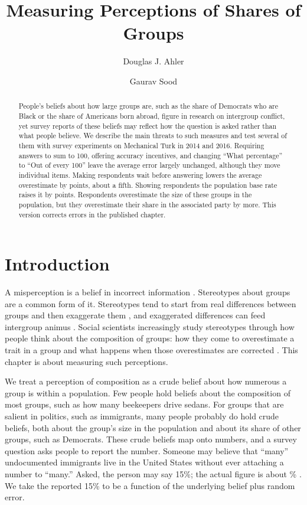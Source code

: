 \documentclass[11pt]{article}
\title{Measuring Perceptions of Shares of Groups}
\author{Douglas J. Ahler \and Gaurav Sood}
\date{}
\begin{document}
\maketitle

\begin{abstract}
\noindent People's beliefs about how large groups are, such as the share of Democrats who are Black or the share of Americans born abroad, figure in research on intergroup conflict, yet survey reports of these beliefs may reflect how the question is asked rather than what people believe. We describe the main threats to such measures and test several of them with survey experiments on Mechanical Turk in 2014 and 2016. Requiring answers to sum to 100, offering accuracy incentives, and changing ``What percentage'' to ``Out of every 100'' leave the average error largely unchanged, although they move individual items. Making respondents wait before answering lowers the average overestimate by \timeEffect{} points, about a fifth. Showing respondents the population base rate raises it by \brEffect{} points. Respondents overestimate the size of these groups in the population, but they overestimate their share in the associated party by more. This version corrects errors in the published chapter.
\end{abstract}

\section{Introduction}

A misperception is a belief in incorrect information \citep{luskin2013}. Stereotypes about groups are a common form of it. Stereotypes tend to start from real differences between groups and then exaggerate them \citep{bordalo2016}, and exaggerated differences can feed intergroup animus \citep{ahler2018}. Social scientists increasingly study stereotypes through how people think about the composition of groups: how they come to overestimate a trait in a group \citep{bordalo2016, gennaioli2010} and what happens when those overestimates are corrected \citep{ahler2018}. This chapter is about measuring such perceptions.

We treat a perception of composition as a crude belief about how numerous a group is within a population. Few people hold beliefs about the composition of most groups, such as how many beekeepers drive sedans. For groups that are salient in politics, such as immigrants, many people probably do hold crude beliefs, both about the group's size in the population and about its share of other groups, such as Democrats. These crude beliefs map onto numbers, and a survey question asks people to report the number. Someone may believe that ``many'' undocumented immigrants live in the United States without ever attaching a number to ``many.'' Asked, the person may say 15\%; the actual figure is about \undocShare\% \citep{krogstad2016}. We take the reported 15\% to be a function of the underlying belief plus random error.
\end{document}
